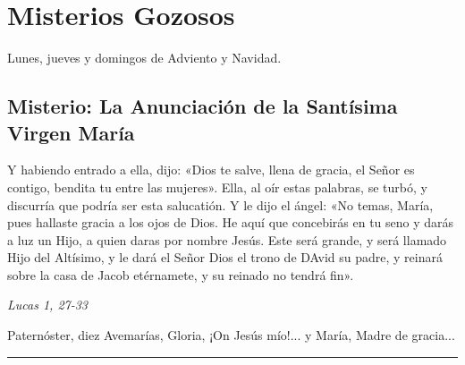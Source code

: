 \documentclass[./rosary.tex]{subfiles}
\newcounter{joyful-counter}
\begin{document}
\section*{Misterios Gozosos}
Lunes, jueves y domingos de Adviento y Navidad.

\subsection*{ Misterio: La Anunciación de la Santísima Virgen María}
Y habiendo entrado a ella, dijo: «Dios te salve, llena de gracia, el Señor es contigo, bendita tu entre las mujeres».
Ella, al oír estas palabras, se turbó, y discurría que podría ser esta salucatión. Y le dijo el ángel: «No temas, María,
pues hallaste gracia a los ojos de Dios. He aquí que concebirás en tu seno y darás a luz un Hijo, a quien daras por
nombre Jesús. Este será grande, y será llamado Hijo del Altísimo, y le dará el Señor Dios el trono de DAvid su padre,
y reinará sobre la casa de Jacob etérnamete, y su reinado no tendrá fin».

\begin{flushright}
      \emph{Lucas 1, 27-33}
\end{flushright}

Paternóster, diez Avemarías, Gloria, ¡On Jesús mío!... y María, Madre de gracia...

\rule{\textwidth}{0.5pt}
\end{document}
